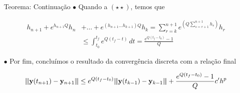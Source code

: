 \documentclass{beamer}
\newcommand{\vertiii}[1]{{\left\vert\kern-0.25ex\left\vert\kern-0.25ex\left\vert #1 
    \right\vert\kern-0.25ex\right\vert\kern-0.25ex\right\vert}}
\theoremstyle{plain}
\theoremstyle{definition}
\begin{document}

\begin{frame}{Teorema: Continuação}
    \noindent
    \phantom{aa} $\bullet$ Quando a $(\star \star)$, temos que

    

    \[
        \begin{split}
            h_{n+1} + e^{h_{n+1}Q}h_n &+ \dots + e^{(h_{n+1} \dots h_{k+1})Q}h_k = 
            \sum_{r = k}^{n+1}e^{\left( Q \sum_{s = r + 1}^{n+1}h_s \right)} h_r \\
            &\leq \int_{t_0}^{t_f} e^{Q(t_f - t)} \, dt = \frac{e^{Q(t_f - t_0)} - 1}{Q}
        \end{split}
    \]

    \phantom{aa} $\bullet$ Por fim, concluímos o resultado da convergência discreta com a relação final

    \[
      \vertiii{  \mathbf{y}(t_{n+1})-\mathbf{y}_{n+1} } \leq e^{Q(t_{f}-t_{0})} \vertiii{ \mathbf{y}(t_{k-1})-\mathbf{y}_{k-1} }
      +\frac{e^{Q(t_{f}-t_{0})}-1}{Q} c' h^{p}
    \]
\end{frame}



\end{document}
